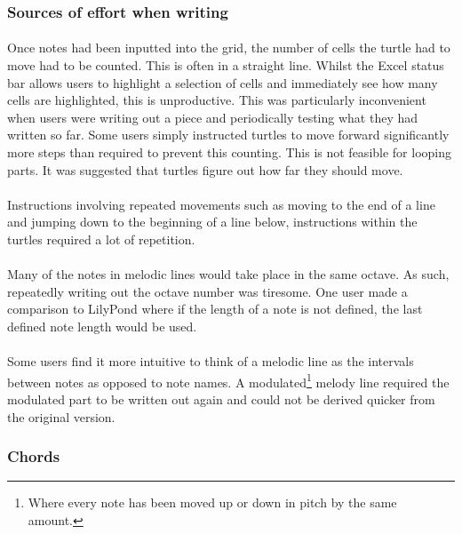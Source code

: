 \subsubsection{Sources of effort when writing}

\paragraph{} Once notes had been inputted into the grid, the number of cells the turtle had to move had to be counted. This is often in a straight line. Whilst the Excel status bar allows users to highlight a selection of cells and immediately see how many cells are highlighted, this is unproductive. This was particularly inconvenient when users were writing out a piece and periodically testing what they had written so far. Some users simply instructed turtles to move forward significantly more steps than required to prevent this counting. This is not feasible for looping parts. It was suggested that turtles figure out how far they should move.

\paragraph{} Instructions involving repeated movements such as moving to the end of a line and jumping down to the beginning of a line below, instructions within the turtles required a lot of repetition.

\paragraph{} Many of the notes in melodic lines would take place in the same octave. As such, repeatedly writing out the octave number was tiresome. One user made a comparison to LilyPond \cite{sandberg:lily} where if the length of a note is not defined, the last defined note length would be used.

\paragraph{} Some users find it more intuitive to think of a melodic line as the intervals between notes as opposed to note names. A modulated\footnote{Where every note has been moved up or down in pitch by the same amount.} melody line required the modulated part to be written out again and could not be derived quicker from the original version.

\subsubsection{Chords}

